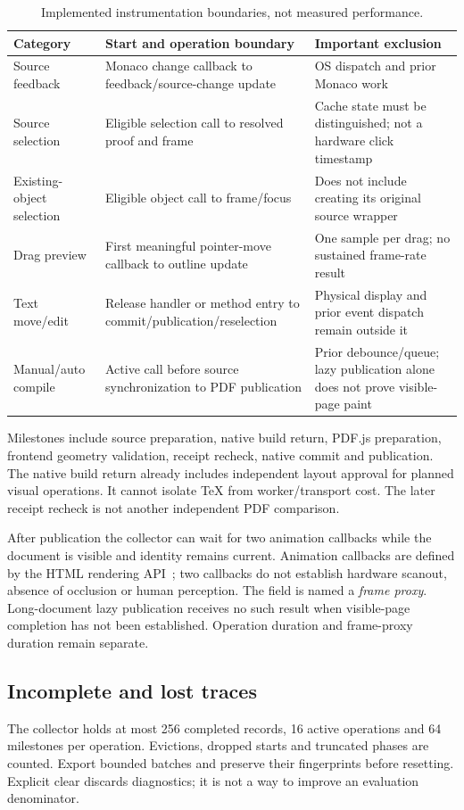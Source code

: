 \begin{table}[htbp]
\small\begin{tabularx}{\linewidth}{@{}>{\raggedright\arraybackslash}p{.24\linewidth}YY@{}}
\toprule
Category & Start and operation boundary & Important exclusion\\
\midrule
Source feedback & Monaco change callback to feedback/source-change update & OS dispatch and prior Monaco work\\
Source selection & Eligible selection call to resolved proof and frame & Cache state must be distinguished; not a hardware click timestamp\\
Existing-object selection & Eligible object call to frame/focus & Does not include creating its original source wrapper\\
Drag preview & First meaningful pointer-move callback to outline update & One sample per drag; no sustained frame-rate result\\
Text move/edit & Release handler or method entry to commit/publication/reselection & Physical display and prior event dispatch remain outside it\\
Manual/auto compile & Active call before source synchronization to PDF publication & Prior debounce/queue; lazy publication alone does not prove visible-page paint\\
\bottomrule
\end{tabularx}
\caption{Implemented instrumentation boundaries, not measured performance.}
\label{tab:timing}
\end{table}

Milestones include source preparation, native build return, PDF.js preparation,
frontend geometry validation, receipt recheck, native commit and publication.
The native build return already includes independent layout approval for
planned visual operations. It cannot isolate TeX from worker/transport cost.
The later receipt recheck is not another independent PDF comparison.

After publication the collector can wait for two animation callbacks while
the document is visible and identity remains current. Animation callbacks
are defined by the HTML rendering API~\cite{animationframes}; two callbacks
do not establish hardware scanout, absence of occlusion or human perception.
The field is named a \emph{frame proxy}. Long-document lazy publication receives
no such result when visible-page completion has not been established.
Operation duration and frame-proxy duration remain separate.

\subsection{Incomplete and lost traces}
The collector holds at most 256 completed records, 16 active operations and
64 milestones per operation. Evictions, dropped starts and truncated phases
are counted. Export bounded batches and preserve their fingerprints before
resetting. Explicit clear discards diagnostics; it is not a way to improve an
evaluation denominator.

